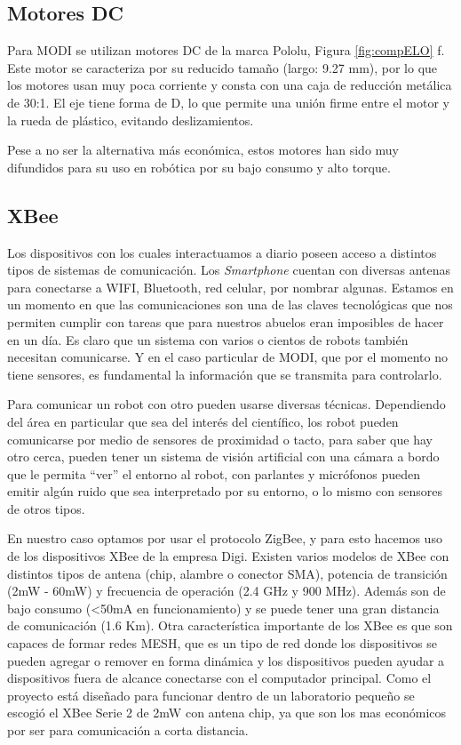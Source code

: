 \subsection{Motores DC}
Para MODI se utilizan motores DC de la marca Pololu, Figura \ref{fig:compELO} f. Este motor se caracteriza por su reducido tamaño (largo: 9.27 mm), por lo que los motores usan muy poca corriente y consta con una caja de reducción metálica de 30:1. El eje tiene forma de D, lo que permite una unión firme entre el motor y la rueda de plástico, evitando deslizamientos.

Pese a no ser la alternativa más económica, estos motores han sido muy difundidos para su uso en robótica por su bajo consumo y alto torque. 
\subsection{XBee}

Los dispositivos con los cuales interactuamos a diario poseen acceso a distintos tipos de sistemas de comunicación. Los \textit{Smartphone} cuentan con diversas antenas para conectarse a WIFI, Bluetooth, red celular,  por nombrar algunas. Estamos en un momento en que las comunicaciones son una de las claves tecnológicas que nos permiten cumplir con tareas que para nuestros abuelos eran imposibles de hacer en un día. Es claro que un sistema con varios o cientos de robots también necesitan comunicarse. Y en el caso particular de MODI, que por el momento no tiene sensores, es fundamental la información que se transmita para controlarlo. 

Para comunicar un robot con otro pueden usarse diversas técnicas. Dependiendo del área en particular que sea del interés del científico, los robot pueden comunicarse por medio de sensores de proximidad o tacto, para saber que hay otro cerca, pueden tener un sistema de visión artificial con una cámara a bordo que le permita “ver” el entorno al robot, con parlantes y micrófonos pueden emitir algún ruido que sea interpretado por su entorno, o lo mismo con sensores de otros tipos.

En nuestro caso optamos por usar el protocolo ZigBee, y para esto hacemos uso de los dispositivos XBee de la empresa Digi. Existen varios modelos de XBee con distintos tipos de antena (chip, alambre o conector SMA), potencia de transición (2mW - 60mW) y frecuencia de operación (2.4 GHz y 900 MHz). Además son de bajo consumo (<50mA en funcionamiento) y se puede tener una gran distancia de comunicación (1.6 Km). Otra característica importante de los XBee es que son capaces de formar redes MESH, que es un tipo de red donde los dispositivos se pueden agregar o remover en forma dinámica y los dispositivos pueden ayudar a dispositivos fuera de alcance conectarse con el computador principal. Como el proyecto está diseñado para funcionar dentro de un laboratorio pequeño se escogió el XBee Serie 2 de 2mW con antena chip, ya que son los mas económicos por ser para comunicación a corta distancia.

